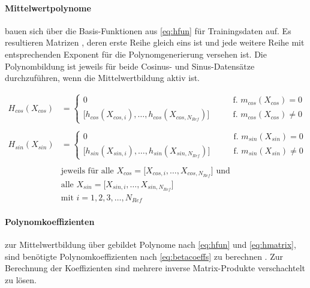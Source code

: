 \paragraph*{Mittelwertpolynome} bauen sich über die Basis-Funktionen aus \autoref{eq:hfun} für Trainingsdaten auf. Es resultieren Matrizen \cite{Rasmussen2006}, deren erste Reihe gleich eins ist und jede weitere Reihe mit entsprechenden Exponent für die Polynomgenerierung versehen ist. Die Polynombildung ist jeweils für beide Cosinus- und Sinus-Datensätze durchzuführen, wenn die Mittelwertbildung aktiv ist.


\begin{align}\label{eq:hmatrix}
	H_{cos}(X_{cos}) &=
		\begin{cases}
			0 															   &\qquad \text{f. } m_{cos}(X_{cos}) = 0 \\
			\big[ h_{cos}(X_{cos,i}),\ldots,h_{cos}(X_{cos,N_{Ref}}) \big] &\qquad \text{f. } m_{cos}(X_{cos}) \ne 0
		\end{cases} \nonumber \\
	\\
	H_{sin}(X_{sin}) &=
		\begin{cases}
			0															   &\qquad \text{f. } m_{sin}(X_{sin}) = 0 \\
			\big[ h_{sin}(X_{sin,i}),\ldots,h_{sin}(X_{sin,N_{Ref}}) \big] &\qquad \text{f. } m_{sin}(X_{sin}) \ne 0
		\end{cases} \nonumber \\
	\nonumber \\
	& \text{jeweils für alle } X_{cos} = \big[ X_{cos,i},\dots, X_{cos,N_{Ref}} \big] \text{ und } \nonumber \\
	& \text{alle } X_{sin} = \big[ X_{sin,i},\dots, X_{sin,N_{Ref}} \big] \nonumber \\
	& \text{mit } i = 1,2,3,\ldots,N_{Ref} \nonumber
\end{align}



\paragraph*{Polynomkoeffizienten} zur Mittelwertbildung über gebildet Polynome nach \autoref{eq:hfun} und \autoref{eq:hmatrix}, sind benötigte Polynomkoeffizienten nach \autoref{eq:betacoeffs} zu berechnen \cite{Rasmussen2006}. Zur Berechnung der Koeffizienten sind mehrere inverse Matrix-Produkte verschachtelt zu lösen. 


\clearpage


